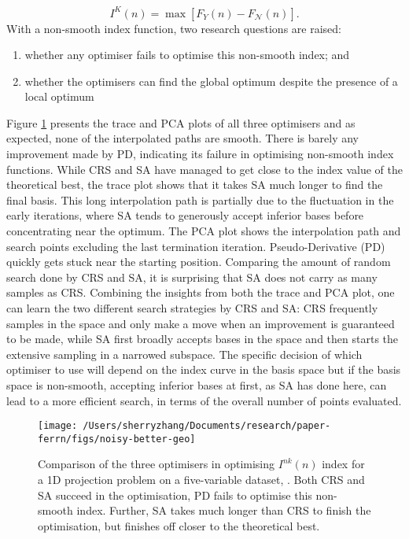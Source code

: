 \[I^{K}(n) = \max \left[F_{Y}(n) - F_{\mathcal{N}}(n)\right].\] With a
non-smooth index function, two research questions are raised:

\begin{enumerate}
\def\labelenumi{\arabic{enumi})}
\tightlist
\item
  whether any optimiser fails to optimise this non-smooth index; and
\item
  whether the optimisers can find the global optimum despite the
  presence of a local optimum
\end{enumerate}

Figure \ref{fig:noisy-better-geo} presents the trace and PCA plots of
all three optimisers and as expected, none of the interpolated paths are
smooth. There is barely any improvement made by PD, indicating its
failure in optimising non-smooth index functions. While CRS and SA have
managed to get close to the index value of the theoretical best, the
trace plot shows that it takes SA much longer to find the final basis.
This long interpolation path is partially due to the fluctuation in the
early iterations, where SA tends to generously accept inferior bases
before concentrating near the optimum. The PCA plot shows the
interpolation path and search points excluding the last termination
iteration. Pseudo-Derivative (PD) quickly gets stuck near the starting
position. Comparing the amount of random search done by CRS and SA, it
is surprising that SA does not carry as many samples as CRS. Combining
the insights from both the trace and PCA plot, one can learn the two
different search strategies by CRS and SA: CRS frequently samples in the
space and only make a move when an improvement is guaranteed to be made,
while SA first broadly accepts bases in the space and then starts the
extensive sampling in a narrowed subspace. The specific decision of
which optimiser to use will depend on the index curve in the basis space
but if the basis space is non-smooth, accepting inferior bases at first,
as SA has done here, can lead to a more efficient search, in terms of
the overall number of points evaluated.

\begin{Schunk}
\begin{figure}

{\centering \texttt{[image: /Users/sherryzhang/Documents/research/paper-ferrn/figs/noisy-better-geo]} 

}

\caption[Comparison of the three optimisers in optimising $I^{nk}(n)$ index for a 1D projection problem on a five-variable dataset, ]{Comparison of the three optimisers in optimising $I^{nk}(n)$ index for a 1D projection problem on a five-variable dataset, . Both CRS and SA succeed in the optimisation, PD fails to optimise this non-smooth index. Further, SA takes  much longer than CRS to finish the optimisation, but finishes off closer to the theoretical best.}\label{fig:noisy-better-geo}
\end{figure}
\end{Schunk}

